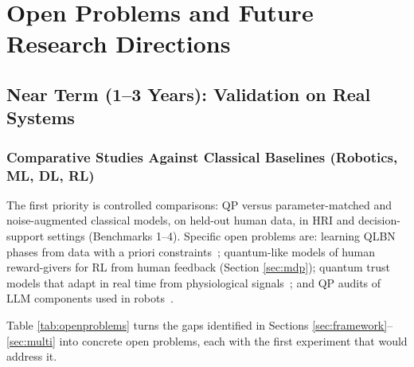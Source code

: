 \documentclass[pdflatex,sn-basic]{sn-jnl}
\begin{document}
\section{Open Problems and Future Research Directions}\label{sec:directions}

\subsection{Near Term (1--3 Years): Validation on Real Systems}

\subsubsection{Comparative Studies Against Classical Baselines (Robotics, ML, DL, RL)}
The first priority is controlled comparisons: QP versus parameter-matched and noise-augmented classical models, on held-out human data, in HRI and decision-support settings (Benchmarks 1--4). Specific open problems are: learning QLBN phases from data with a priori constraints~\citep{Wichert2020}; quantum-like models of human reward-givers for RL from human feedback (Section \ref{sec:mdp}); quantum trust models that adapt in real time from physiological signals~\citep{Roeder2023}; and QP audits of LLM components used in robots~\citep{Lo2025}.

Table \ref{tab:openproblems} turns the gaps identified in Sections \ref{sec:framework}--\ref{sec:multi} into concrete open problems, each with the first experiment that would address it.
\end{document}
